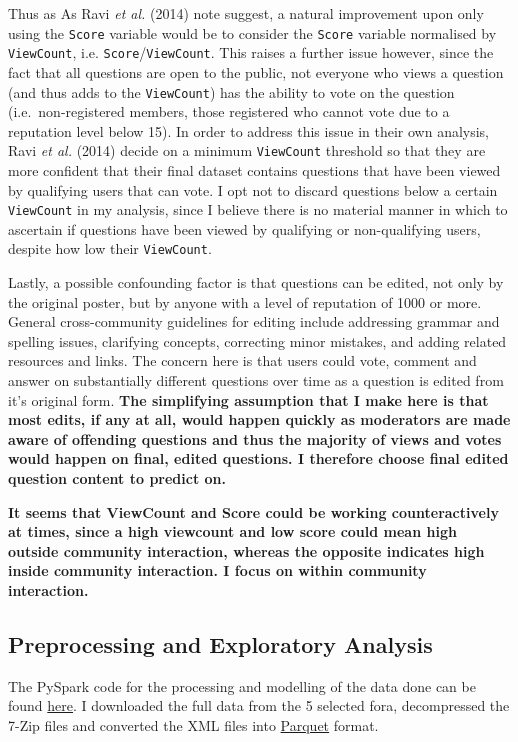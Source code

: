 \documentclass[11pt,preprint, authoryear]{article}
\numberwithin{equation}{section}
\numberwithin{figure}{section}
\begin{document}
Thus as As Ravi \emph{et al.} (2014) note suggest, a natural improvement
upon only using the \texttt{Score} variable would be to consider the
\texttt{Score} variable normalised by \texttt{ViewCount}, i.e.
\texttt{Score}/\texttt{ViewCount}. This raises a further issue however,
since the fact that all questions are open to the public, not everyone
who views a question (and thus adds to the \texttt{ViewCount}) has the
ability to vote on the question (i.e.~non-registered members, those
registered who cannot vote due to a reputation level below 15). In order
to address this issue in their own analysis, Ravi \emph{et al.} (2014)
decide on a minimum \texttt{ViewCount} threshold so that they are more
confident that their final dataset contains questions that have been
viewed by qualifying users that can vote. I opt not to discard questions
below a certain \texttt{ViewCount} in my analysis, since I believe there
is no material manner in which to ascertain if questions have been
viewed by qualifying or non-qualifying users, despite how low their
\texttt{ViewCount}.

Lastly, a possible confounding factor is that questions can be edited,
not only by the original poster, but by anyone with a level of
reputation of 1000 or more. General cross-community guidelines for
editing include addressing grammar and spelling issues, clarifying
concepts, correcting minor mistakes, and adding related resources and
links. The concern here is that users could vote, comment and answer on
substantially different questions over time as a question is edited from
it's original form. \textbf{The simplifying assumption that I make here
is that most edits, if any at all, would happen quickly as moderators
are made aware of offending questions and thus the majority of views and
votes would happen on final, edited questions. I therefore choose final
edited question content to predict on.}

\textbf{It seems that ViewCount and Score could be working
counteractively at times, since a high viewcount and low score could
mean high outside community interaction, whereas the opposite indicates
high inside community interaction. I focus on within community
interaction.}

\subsection{Preprocessing and Exploratory
Analysis}\label{preprocessing-and-exploratory-analysis}

The PySpark code for the processing and modelling of the data done can
be found
\href{https://github.com/BCallumCarr/msc-lse-thesis/tree/master/01-python-code}{here}.
I downloaded the full data from the 5 selected fora, decompressed the
7-Zip files and converted the XML files into
\href{https://parquet.apache.org}{Parquet} format.
\end{document}
